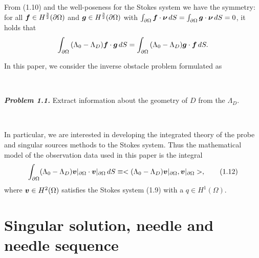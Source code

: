From (1.10) and the well-poseness for the Stokes system we have the symmetry:
for all $\mbox{\boldmath $f$}\in H^{\frac{3}{2}}(\partial\Omega)$ and $\mbox{\boldmath $g$}\in H^{\frac{3}{2}}
(\partial\Omega)$ with $\int_{\partial\Omega}\mbox{\boldmath $f$}\cdot\mbox{\boldmath $\nu$}\,dS=
\int_{\partial\Omega}\mbox{\boldmath $g$}\cdot\mbox{\boldmath $\nu$}\,dS=0$, it holds that
$$\displaystyle
\int_{\partial\Omega}\,(\Lambda_0-\Lambda_D)\mbox{\boldmath $f$}\cdot\mbox{\boldmath $g$}\,dS
=\int_{\partial\Omega}\,(\Lambda_0-\Lambda_D)\mbox{\boldmath $g$}\cdot\mbox{\boldmath $f$}\,dS.
$$













In this paper, we consider the inverse obstacle problem  formulated as

$\quad$


{\it\noindent\bf Problem 1.1.}
 Extract information about the geometry of $D$ from the $\Lambda_D$.  
 
 
 
 $\quad$
 
 In particular, we are interested in developing the integrated theory of the probe and singular sources methods
 \cite{IPS} to the Stokes system.
 Thus the mathematical model of the observation data used in this paper is the integral
 $$\displaystyle
 \int_{\partial\Omega}(\Lambda_0-\Lambda_D)\mbox{\boldmath $v$}\vert_{\partial\Omega}
 \cdot\mbox{\boldmath $v$}\vert_{\partial\Omega}\,dS
 \equiv <(\Lambda_0-\Lambda_D)\mbox{\boldmath $v$}\vert_{\partial\Omega}, 
 \mbox{\boldmath $v$}\vert_{\partial\Omega}>,
 \tag {1.12}
 $$
 where $\mbox{\boldmath $v$}\in H^2(\Omega)$ satisfies the Stokes system (1.9)
 with a $q\in H^1(\Omega)$.  
 
   


























\section{Singular solution, needle and needle sequence}










